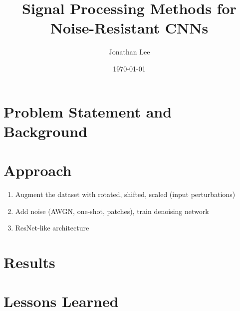 \documentclass[justified]{article}
\begin{document}
  \title{Signal Processing Methods for Noise-Resistant CNNs}
  \author{Jonathan Lee}
  \date{\today}
  \maketitle

  \section{Problem Statement and Background}

  \section{Approach}

  \begin{enumerate}
  \item Augment the dataset with rotated, shifted, scaled (input perturbations)
  \item Add noise (AWGN, one-shot, patches), train denoising network
  \item ResNet-like architecture
  \end{enumerate}

  \section{Results}

  \section{}

  \section{Lessons Learned}
\end{document}
